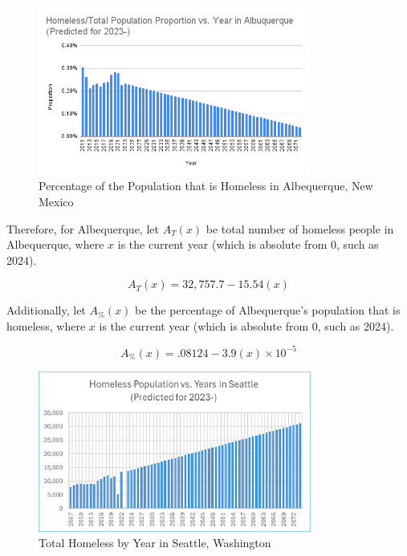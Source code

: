 \documentclass[12pt]{article}
\begin{document}
\begin{figure}[H]
  \centering
  \includegraphics[width=0.8\textwidth]{homeless-prop-vs-year-alb}
  \caption{Percentage of the Population that is Homeless in Albequerque, New Mexico}
\end{figure}

\noindent
Therefore, for Albequerque, let $A_{T}(x)$ be total number of homeless people in Albequerque, where $x$ is the current year (which is absolute from 0, such as 2024).

$$A_{T}(x) = 32,757.7 - 15.54(x)$$

\noindent
Additionally, let $A_{\%}(x)$ be the percentage of Albequerque's population that is homeless, where $x$ is the current year (which is absolute from 0, such as 2024).

$$A_{\%}(x) = .08124 - 3.9(x) \times 10^{-5}$$

\begin{figure}[H]
  \centering
  \includegraphics[width=0.8\textwidth]{homeless-vs-year-seattle}
  \caption{Total Homeless by Year in Seattle, Washington}
\end{figure}
\end{document}
